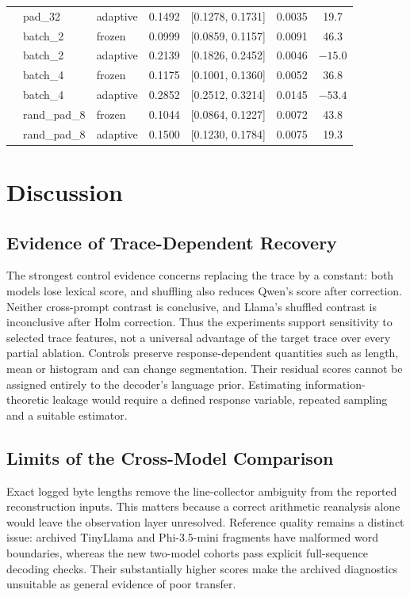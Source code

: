 \documentclass[electronics,article,submit,pdftex,moreauthors]{Definitions/mdpi}
\begin{document}
\begin{table}[ht]
{\begin{tabular}{l l l c c c c}
 & pad\_32 & adaptive & 0.1492 & [0.1278, 0.1731] & 0.0035 & 19.7 \\
 & batch\_2 & frozen & 0.0999 & [0.0859, 0.1157] & 0.0091 & 46.3 \\
 & batch\_2 & adaptive & 0.2139 & [0.1826, 0.2452] & 0.0046 & $-15.0$ \\
 & batch\_4 & frozen & 0.1175 & [0.1001, 0.1360] & 0.0052 & 36.8 \\
 & batch\_4 & adaptive & 0.2852 & [0.2512, 0.3214] & 0.0145 & $-53.4$ \\
 & rand\_pad\_8 & frozen & 0.1044 & [0.0864, 0.1227] & 0.0072 & 43.8 \\
 & rand\_pad\_8 & adaptive & 0.1500 & [0.1230, 0.1784] & 0.0075 & 19.3 \\
\bottomrule
\end{tabular}%
}
\end{table}

\section{Discussion}
\subsection{Evidence of Trace-Dependent Recovery}
The strongest control evidence concerns replacing the trace by a constant: both models lose lexical score, and shuffling also reduces Qwen's score after correction. Neither cross-prompt contrast is conclusive, and Llama's shuffled contrast is inconclusive after Holm correction. Thus the experiments support sensitivity to selected trace features, not a universal advantage of the target trace over every partial ablation. Controls preserve response-dependent quantities such as length, mean or histogram and can change segmentation. Their residual scores cannot be assigned entirely to the decoder's language prior. Estimating information-theoretic leakage would require a defined response variable, repeated sampling and a suitable estimator.

\subsection{Limits of the Cross-Model Comparison}
Exact logged byte lengths remove the line-collector ambiguity from the reported reconstruction inputs. This matters because a correct arithmetic reanalysis alone would leave the observation layer unresolved. Reference quality remains a distinct issue: archived TinyLlama and Phi-3.5-mini fragments have malformed word boundaries, whereas the new two-model cohorts pass explicit full-sequence decoding checks. Their substantially higher scores make the archived diagnostics unsuitable as general evidence of poor transfer.
\end{document}
